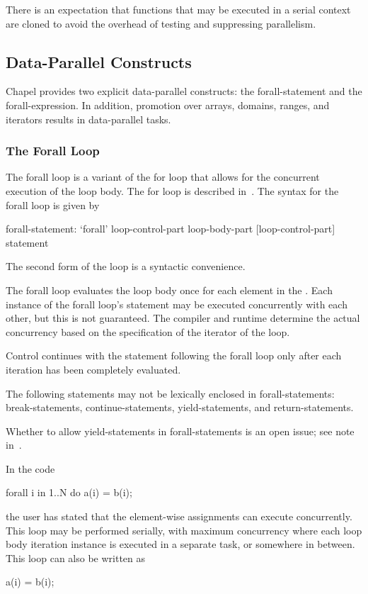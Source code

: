 There is an expectation that functions that may be executed in a
serial context are cloned to avoid the overhead of testing and
suppressing parallelism.

\subsection{Data-Parallel Constructs}
\label{data_parallelism}

Chapel provides two explicit data-parallel constructs: the
forall-statement and the forall-expression.  In addition, promotion
over arrays, domains, ranges, and iterators results in data-parallel
tasks.

\subsubsection{The Forall Loop}
\label{Forall}

The forall loop is a variant of the for loop that allows for the
concurrent execution of the loop body. The for loop is described
in~. The syntax for the forall loop is given by
\begin{syntax}
forall-statement:
  `forall' loop-control-part loop-body-part
  [loop-control-part] statement
\end{syntax}
The second form of the loop is a syntactic convenience.

The forall loop evaluates the loop body once for each element in
the .  Each instance of the forall loop's
statement may be executed concurrently with each other, but this is
not guaranteed.  The compiler and runtime determine the actual
concurrency based on the specification of the iterator of the loop.

Control continues with the statement following the forall loop only
after each iteration has been completely evaluated.

The following statements may not be lexically enclosed in
forall-statements: break-statements, continue-statements,
yield-statements, and return-statements.

\begin{openissue}
Whether to allow yield-statements in forall-statements is an open
issue; see note in~.
\end{openissue}

\begin{example}
In the code
\begin{chapel}
forall i in 1..N do
  a(i) = b(i);
\end{chapel}
the user has stated that the element-wise assignments can execute
concurrently.  This loop may be performed serially, with maximum
concurrency where each loop body iteration instance is executed in a
separate task, or somewhere in between.  This loop can also be written
as
\begin{chapel}
[i in 1..N] a(i) = b(i);
\end{chapel}
\end{example}

